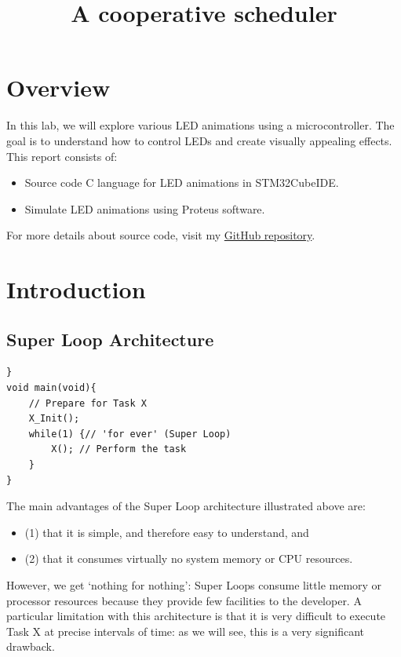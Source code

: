 \documentclass[twoside, final]{hcmut_report}
\title{\Large A cooperative scheduler}
\begin{document}
\coverpage
\pagestyle{empty}
\tableofcontents
\pagestyle{fancy}
\pagebreak
\section{Overview}
In this lab, we will explore various LED animations using a microcontroller. The goal is to understand how to control LEDs and create visually appealing effects.
This report consists of:
\begin{itemize}
    \item Source code C language for LED animations in STM32CubeIDE.
    \item Simulate LED animations using Proteus software.
\end{itemize}
For more details about source code, visit my \href{https://github.com/batmaon512/Microcontroller-251.git}{GitHub repository}.

\section{Introduction}
\subsection{Super Loop Architecture}
\begin{lstlisting}[basicstyle=\small, caption=Super loop program,label = {program_super_loop}]
}
void main(void){
    // Prepare for Task X
    X_Init();
    while(1) {// 'for ever' (Super Loop)
        X(); // Perform the task
    } 
}
\end{lstlisting}
The main advantages of the Super Loop architecture illustrated above are:
\begin{itemize}
    \item (1) that it is simple, and therefore easy to understand, and 
    \item (2) that it consumes virtually no system memory or CPU resources.
\end{itemize}

However, we get ‘nothing for nothing’: Super Loops consume little memory or
processor resources because they provide few facilities to the developer. A particular
limitation with this architecture is that it is very difficult to execute Task X at precise
intervals of time: as we will see, this is a very significant drawback.
\end{document}
